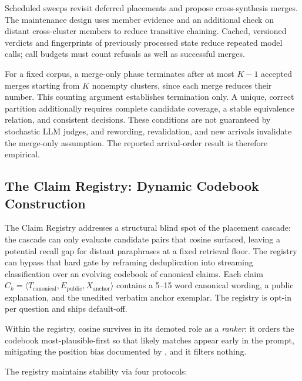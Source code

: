 \documentclass[11pt,a4paper]{article}
\begin{document}
Scheduled sweeps revisit deferred placements and propose cross-synthesis merges. The maintenance design uses member evidence and an additional check on distant cross-cluster members to reduce transitive chaining. Cached, versioned verdicts and fingerprints of previously processed state reduce repeated model calls; call budgets must count refusals as well as successful merges.

For a fixed corpus, a merge-only phase terminates after at most $K-1$ accepted merges starting from $K$ nonempty clusters, since each merge reduces their number. This counting argument establishes termination only. A unique, correct partition additionally requires complete candidate coverage, a stable equivalence relation, and consistent decisions. These conditions are not guaranteed by stochastic LLM judges, and rewording, revalidation, and new arrivals invalidate the merge-only assumption. The reported arrival-order result is therefore empirical.

\subsection{The Claim Registry: Dynamic Codebook Construction}
\label{sec:registry}

The Claim Registry addresses a structural blind spot of the placement cascade: the cascade can only evaluate candidate pairs that cosine surfaced, leaving a potential recall gap for distant paraphrases at a fixed retrieval floor. The registry can bypass that hard gate by reframing deduplication into streaming classification over an evolving codebook of canonical claims. Each claim $C_k = \langle T_{\mathrm{canonical}}, E_{\mathrm{public}}, X_{\mathrm{anchor}} \rangle$ contains a 5--15 word canonical wording, a public explanation, and the unedited verbatim anchor exemplar. The registry is opt-in per question and ships default-off.

Within the registry, cosine survives in its demoted role as a \emph{ranker}: it orders the codebook most-plausible-first so that likely matches appear early in the prompt, mitigating the position bias documented by \citet{liu2024lost}, and it filters nothing.

The registry maintains stability via four protocols:
\end{document}
